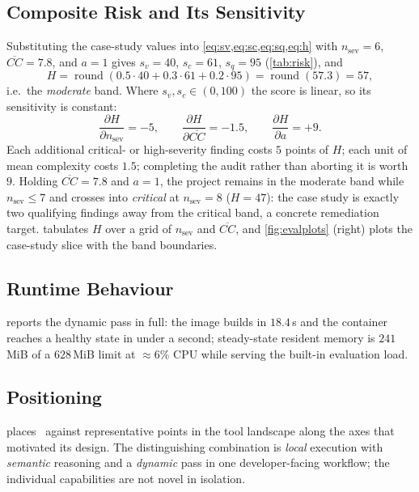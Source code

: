 \subsection{Composite Risk and Its Sensitivity}
Substituting the case-study values into
\cref{eq:sv,eq:sc,eq:sq,eq:h} with $n_{\text{sev}}=6$,
$\overline{CC}=7.8$, and $a=1$ gives $s_v = 40$, $s_c = 61$, $s_q = 95$
(\cref{tab:risk}), and
\[
 H = \operatorname{round}(0.5{\cdot}40 + 0.3{\cdot}61 + 0.2{\cdot}95)
 = \operatorname{round}(57.3) = 57,
\]
i.e.\ the \emph{moderate} band. Where $s_v,s_c \in (0,100)$ the score is
linear, so its sensitivity is constant:
\begin{equation}
 \frac{\partial H}{\partial n_{\text{sev}}} = -5, \qquad
 \frac{\partial H}{\partial \overline{CC}} = -1.5, \qquad
 \frac{\partial H}{\partial a} = +9.
 \label{eq:sens}
\end{equation}
Each additional critical- or high-severity finding costs $5$ points of
$H$; each unit of mean complexity costs $1.5$; completing the audit
rather than aborting it is worth $9$. Holding $\overline{CC}=7.8$ and
$a=1$, the project remains in the moderate band while
$n_{\text{sev}}\le 7$ and crosses into \emph{critical} at
$n_{\text{sev}}=8$ ($H=47$): the case study is exactly two qualifying
findings away from the critical band, a concrete remediation target.
 tabulates $H$ over a grid of $n_{\text{sev}}$ and
$\overline{CC}$, and \cref{fig:evalplots} (right) plots the case-study
slice with the band boundaries.




\subsection{Runtime Behaviour}
 reports the dynamic pass in full: the image builds in
$18.4$\,s and the container reaches a healthy state in under a second;
steady-state resident memory is $241$\,MiB of a $628$\,MiB limit at
$\approx 6\%$ CPU while serving the built-in evaluation load.



\subsection{Positioning}
 places \cs\ against representative points in the tool
landscape along the axes that motivated its design. The distinguishing
combination is \emph{local} execution with \emph{semantic} reasoning and
a \emph{dynamic} pass in one developer-facing workflow; the individual
capabilities are not novel in isolation.


